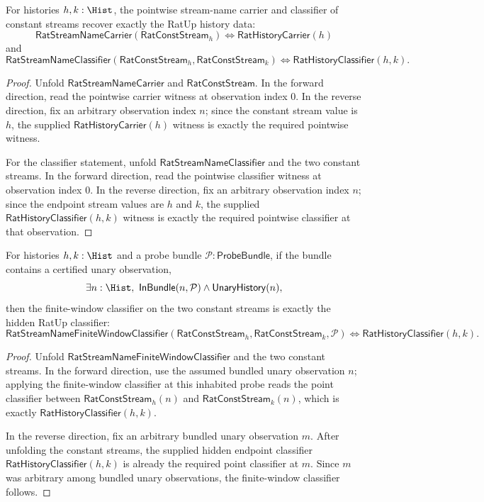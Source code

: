 \begin{theorem}
\label{thm:rat-stream-name-constant-point-exactness}
For histories $h,k:\Hist$, the pointwise stream-name carrier and classifier of
constant streams recover exactly the RatUp history data:
$$
\mathsf{RatStreamNameCarrier}(\mathsf{RatConstStream}_h)
\Longleftrightarrow
\mathsf{RatHistoryCarrier}(h)
$$
and
$$
\mathsf{RatStreamNameClassifier}(\mathsf{RatConstStream}_h,
\mathsf{RatConstStream}_k)
\Longleftrightarrow
\mathsf{RatHistoryClassifier}(h,k).
$$
\end{theorem}
\begin{proof}
Unfold $\mathsf{RatStreamNameCarrier}$ and $\mathsf{RatConstStream}$. In the
forward direction, read the pointwise carrier witness at observation index $0$.
In the reverse direction, fix an arbitrary observation index $n$; since the
constant stream value is $h$, the supplied $\mathsf{RatHistoryCarrier}(h)$
witness is exactly the required pointwise witness.

For the classifier statement, unfold $\mathsf{RatStreamNameClassifier}$ and
the two constant streams. In the forward direction, read the pointwise
classifier witness at observation index $0$. In the reverse direction, fix an
arbitrary observation index $n$; since the endpoint stream values are $h$ and
$k$, the supplied $\mathsf{RatHistoryClassifier}(h,k)$ witness is exactly the
required pointwise classifier at that observation.
\end{proof}

\begin{theorem}
\label{thm:rat-stream-name-constant-finite-window-exactness}
For histories $h,k:\Hist$ and a probe bundle
$\mathcal{P}:\mathsf{ProbeBundle}$, if the bundle contains a certified unary
observation,
$$
\exists n:\Hist,\ \mathsf{InBundle}(n,\mathcal{P})\land
\mathsf{UnaryHistory}(n),
$$
then the finite-window classifier on the two constant streams is exactly the
hidden RatUp classifier:
$$
\mathsf{RatStreamNameFiniteWindowClassifier}(\mathsf{RatConstStream}_h,
\mathsf{RatConstStream}_k,\mathcal{P})
\Longleftrightarrow
\mathsf{RatHistoryClassifier}(h,k).
$$
\end{theorem}
\begin{proof}
Unfold $\mathsf{RatStreamNameFiniteWindowClassifier}$ and the two constant
streams. In the forward direction, use the assumed bundled unary observation
$n$; applying the finite-window classifier at this inhabited probe reads the
point classifier between $\mathsf{RatConstStream}_h(n)$ and
$\mathsf{RatConstStream}_k(n)$, which is exactly
$\mathsf{RatHistoryClassifier}(h,k)$.

In the reverse direction, fix an arbitrary bundled unary observation $m$.
After unfolding the constant streams, the supplied hidden endpoint classifier
$\mathsf{RatHistoryClassifier}(h,k)$ is already the required point classifier
at $m$. Since $m$ was arbitrary among bundled unary observations, the
finite-window classifier follows.
\end{proof}

